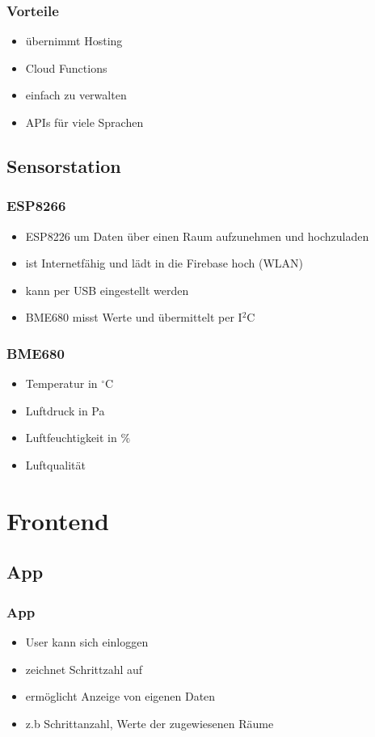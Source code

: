 \documentclass[11pt]{beamer}
\begin{document}
\begin{frame}
	\frametitle{Vorteile}
	
	\begin{itemize}
		\item übernimmt Hosting
		\item Cloud Functions
		\item einfach zu verwalten
		\item APIs für viele Sprachen
	\end{itemize}

\end{frame}

\subsection{Sensorstation}

\begin{frame}
\frametitle{ESP8266}
\begin{itemize}
\item ESP8226 um Daten über einen Raum aufzunehmen und hochzuladen
\item ist Internetfähig und lädt in die Firebase hoch (WLAN)
\item kann per USB eingestellt werden
\item BME680 misst Werte und übermittelt per I$^2$C
\end{itemize}
\end{frame}

\begin{frame}
	\frametitle{BME680}
	\begin{itemize}
	\item Temperatur in $^\circ$C
	\item Luftdruck in Pa
	\item Luftfeuchtigkeit in $\%$
	\item Luftqualität
	\end{itemize}
\end{frame}

\section{Frontend}

\subsection{App}
\begin{frame}
\frametitle{App}
	\begin{itemize}
	\item User kann sich einloggen
	\item zeichnet Schrittzahl auf
	\item ermöglicht Anzeige von eigenen Daten
	\item z.b Schrittanzahl, Werte der zugewiesenen Räume
	\end{itemize}

\end{frame}
\end{document}
